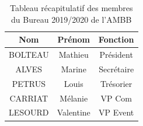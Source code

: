\documentclass[10 pt]{report} %
\begin{document}
        \begin{table}[h]
        \centering
        \caption{Tableau récapitulatif des membres du Bureau 2019/2020 de l'AMBB}
        
        \begin{tabular}{|c|c|c|}
                \hline
                Nom     & Prénom    & Fonction   \\ \hline
                BOLTEAU & Mathieu   & Président  \\ \hline
                ALVES   & Marine    & Secrétaire \\ \hline
                PETRUS  & Louis     & Trésorier  \\ \hline
                CARRIAT  & Mélanie   & VP Com     \\ \hline
                LESOURD & Valentine & VP Event   \\ \hline
            \end{tabular}
            \label{tab:ambb}
        \end{table}

\newpage
{} %
\printbibliography
\end{document}

